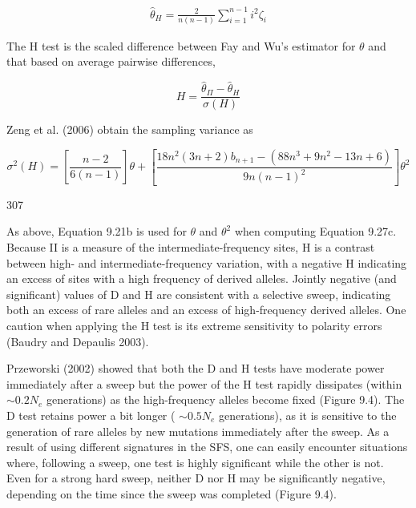 \documentclass{article}
\begin{document}
\begin{equation}
\begin{align*}\widehat{\theta}_H=\frac{2}{n(n-1)}\sum\limits_{i=1}^{n-1}i^2\zeta_i\end{align*}
\tag{9.27a}
\label{eq:9_27a}
\end{equation}

The H test is the scaled difference between Fay and Wu's estimator for  $ \theta $ and that based on average pairwise differences,

\begin{equation}
H=\frac{\widehat{\theta}_{\Pi}-\widehat{\theta}_{H}}{\sigma(H)}
\tag{9.27b}
\label{eq:9_27b}
\end{equation}

Zeng et al. (2006) obtain the sampling variance as

\begin{equation}
\sigma^{2}(H)=\left[\frac{n-2}{6(n-1)}\right]\theta+\left[\frac{18n^{2}(3n+2)b_{n+1}-(88n^{3}+9n^{2}-13n+6)}{9n(n-1)^{2}}\right]\theta^{2}
\tag{9.27c}
\label{eq:9_27c}
\end{equation}

307

As above, Equation 9.21b is used for  $ \theta $ and  $ \theta^{2} $ when computing Equation 9.27c. Because II is a measure of the intermediate-frequency sites, H is a contrast between high- and intermediate-frequency variation, with a negative H indicating an excess of sites with a high frequency of derived alleles. Jointly negative (and significant) values of D and H are consistent with a selective sweep, indicating both an excess of rare alleles and an excess of high-frequency derived alleles. One caution when applying the H test is its extreme sensitivity to polarity errors (Baudry and Depaulis 2003).

Przeworski (2002) showed that both the D and H tests have moderate power immediately after a sweep but the power of the H test rapidly dissipates (within  $ \sim0.2N_e $ generations) as the high-frequency alleles become fixed (Figure 9.4). The D test retains power a bit longer ( $ \sim0.5N_e $ generations), as it is sensitive to the generation of rare alleles by new mutations immediately after the sweep. As a result of using different signatures in the SFS, one can easily encounter situations where, following a sweep, one test is highly significant while the other is not. Even for a strong hard sweep, neither D nor H may be significantly negative, depending on the time since the sweep was completed (Figure 9.4).
\end{document}
